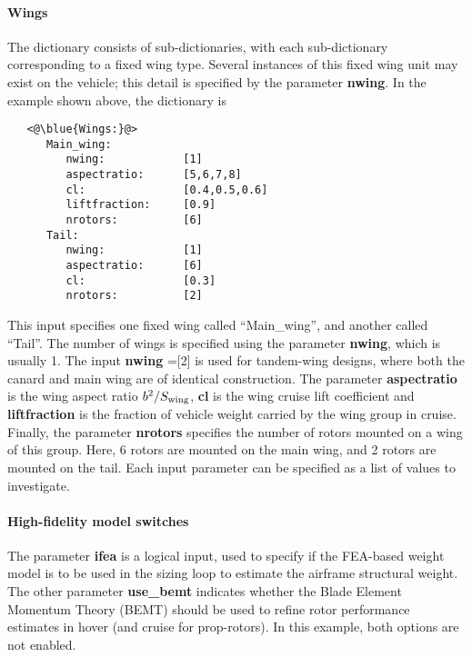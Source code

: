 \paragraph{Wings}
The  dictionary consists of sub-dictionaries, with each sub-dictionary corresponding to a fixed wing type. Several instances of this fixed wing unit may exist on the vehicle; this detail is specified by the parameter \textbf{nwing}. In the example shown above, the  dictionary is 

\begin{lstlisting}
   <@\blue{Wings:}@>
      Main_wing:
         nwing:            [1]
         aspectratio:      [5,6,7,8] 
         cl:               [0.4,0.5,0.6]
         liftfraction:     [0.9]
         nrotors:          [6]
      Tail:
         nwing:            [1]
         aspectratio:      [6]
         cl:               [0.3]
         nrotors:          [2]
\end{lstlisting}
This input specifies one fixed wing called ``Main\_wing'', and another called ``Tail''. The number of wings is specified using the parameter \textbf{nwing}, which is usually 1. The input \textbf{nwing} =[2] is used for tandem-wing designs, where both the canard and main wing are of identical construction. The parameter \textbf{aspectratio} is the wing aspect ratio $b^2/S_{\rm wing}$, \textbf{cl} is the wing cruise lift coefficient and \textbf{liftfraction} is the fraction of vehicle weight carried by the wing group in cruise. Finally, the parameter \textbf{nrotors} specifies the number of rotors mounted on a wing of this group. Here, 6 rotors are mounted on the main wing, and 2 rotors are mounted on the tail. Each input parameter can be specified as a list of values to investigate. 

\paragraph{High-fidelity model switches}
The parameter \textbf{ifea} is a logical input, used to specify if the FEA-based weight model is to be used in the sizing loop to estimate the airframe structural weight. The other parameter \textbf{use\_bemt} indicates whether the Blade Element Momentum Theory (BEMT) should be used to refine rotor performance estimates in hover (and cruise for prop-rotors). In this example, both options are not enabled. 
 
